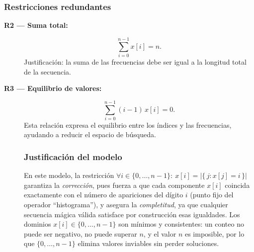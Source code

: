 \subsubsection*{Restricciones redundantes}
\begin{description}
  \item[\textbf{R2 — Suma total:}]
  \[
  \sum_{i=0}^{n-1} x[i] = n.
  \]
  Justificación: la suma de las frecuencias debe ser igual a la longitud total de la secuencia.

  \item[\textbf{R3 — Equilibrio de valores:}]
  \[
  \sum_{i=0}^{n-1} (i-1)\,x[i] = 0.
  \]
  Esta relación expresa el equilibrio entre los índices y las frecuencias, ayudando a reducir el espacio de búsqueda.

\subsubsection*{Justificación del modelo}
En este modelo, la restricción \(\forall i \in \{0,\dots,n-1\}:~ x[i] = \bigl|\{\,j : x[j]=i\,\}\bigr|\) garantiza la \emph{corrección}, pues fuerza a que cada componente \(x[i]\) coincida exactamente con el número de apariciones del dígito \(i\) (punto fijo del operador ``histograma''), y asegura la \emph{completitud}, ya que cualquier secuencia mágica válida satisface por construcción esas igualdades. Los dominios \(x[i]\in\{0,\dots,n-1\}\) son mínimos y consistentes: un conteo no puede ser negativo, no puede superar \(n\), y el valor \(n\) es imposible, por lo que \(\{0,\dots,n-1\}\) elimina valores inviables sin perder soluciones.
\end{description}